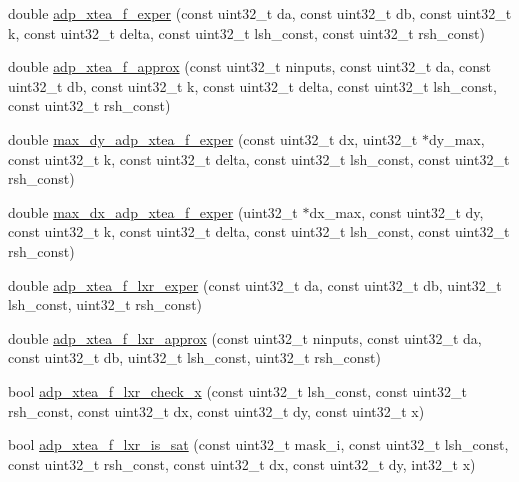 \begin{DoxyCompactItemize}
\item 
double \hyperlink{adp-xtea-f-fk_8hh_afc8e94b86821e291ee04292462a6b6ed}{adp\-\_\-xtea\-\_\-f\-\_\-exper} (const uint32\-\_\-t da, const uint32\-\_\-t db, const uint32\-\_\-t k, const uint32\-\_\-t delta, const uint32\-\_\-t lsh\-\_\-const, const uint32\-\_\-t rsh\-\_\-const)
\item 
double \hyperlink{adp-xtea-f-fk_8hh_ae945b860edf247413923712da6049e24}{adp\-\_\-xtea\-\_\-f\-\_\-approx} (const uint32\-\_\-t ninputs, const uint32\-\_\-t da, const uint32\-\_\-t db, const uint32\-\_\-t k, const uint32\-\_\-t delta, const uint32\-\_\-t lsh\-\_\-const, const uint32\-\_\-t rsh\-\_\-const)
\item 
double \hyperlink{adp-xtea-f-fk_8hh_adcd285fa82803159c2bd305f3b6af692}{max\-\_\-dy\-\_\-adp\-\_\-xtea\-\_\-f\-\_\-exper} (const uint32\-\_\-t dx, uint32\-\_\-t $\ast$dy\-\_\-max, const uint32\-\_\-t k, const uint32\-\_\-t delta, const uint32\-\_\-t lsh\-\_\-const, const uint32\-\_\-t rsh\-\_\-const)
\item 
double \hyperlink{adp-xtea-f-fk_8hh_adb4dc310e2d779ca1c67def32b9269d0}{max\-\_\-dx\-\_\-adp\-\_\-xtea\-\_\-f\-\_\-exper} (uint32\-\_\-t $\ast$dx\-\_\-max, const uint32\-\_\-t dy, const uint32\-\_\-t k, const uint32\-\_\-t delta, const uint32\-\_\-t lsh\-\_\-const, const uint32\-\_\-t rsh\-\_\-const)
\item 
double \hyperlink{adp-xtea-f-fk_8hh_ac50f3242518f20723245aab340eb792f}{adp\-\_\-xtea\-\_\-f\-\_\-lxr\-\_\-exper} (const uint32\-\_\-t da, const uint32\-\_\-t db, uint32\-\_\-t lsh\-\_\-const, uint32\-\_\-t rsh\-\_\-const)
\item 
double \hyperlink{adp-xtea-f-fk_8hh_a99789dee8eb188999bb10f7562919edb}{adp\-\_\-xtea\-\_\-f\-\_\-lxr\-\_\-approx} (const uint32\-\_\-t ninputs, const uint32\-\_\-t da, const uint32\-\_\-t db, uint32\-\_\-t lsh\-\_\-const, uint32\-\_\-t rsh\-\_\-const)
\item 
bool \hyperlink{adp-xtea-f-fk_8hh_acd7dae800736b30a19b7393823b82c5f}{adp\-\_\-xtea\-\_\-f\-\_\-lxr\-\_\-check\-\_\-x} (const uint32\-\_\-t lsh\-\_\-const, const uint32\-\_\-t rsh\-\_\-const, const uint32\-\_\-t dx, const uint32\-\_\-t dy, const uint32\-\_\-t x)
\item 
bool \hyperlink{adp-xtea-f-fk_8hh_a3f12a9d9fd1ae70e96ed71c6f3961307}{adp\-\_\-xtea\-\_\-f\-\_\-lxr\-\_\-is\-\_\-sat} (const uint32\-\_\-t mask\-\_\-i, const uint32\-\_\-t lsh\-\_\-const, const uint32\-\_\-t rsh\-\_\-const, const uint32\-\_\-t dx, const uint32\-\_\-t dy, int32\-\_\-t x)

\end{DoxyCompactItemize}
